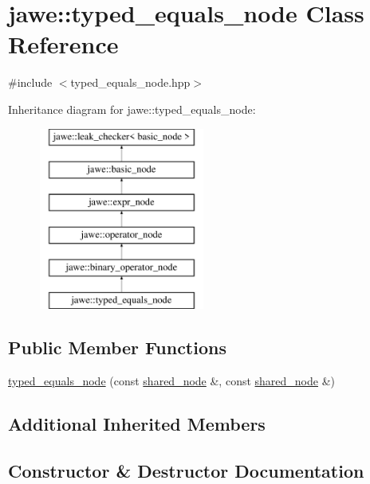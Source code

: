 \hypertarget{classjawe_1_1typed__equals__node}{}\section{jawe\+:\+:typed\+\_\+equals\+\_\+node Class Reference}
\label{classjawe_1_1typed__equals__node}


{\ttfamily \#include $<$typed\+\_\+equals\+\_\+node.\+hpp$>$}

Inheritance diagram for jawe\+:\+:typed\+\_\+equals\+\_\+node\+:\begin{figure}[H]
\begin{center}
\leavevmode
\includegraphics[height=6.000000cm]{classjawe_1_1typed__equals__node}
\end{center}
\end{figure}
\subsection*{Public Member Functions}
\begin{DoxyCompactItemize}
\item 
\hyperlink{classjawe_1_1typed__equals__node_aeac40263be90e2690e356fb5e706f9aa}{typed\+\_\+equals\+\_\+node} (const \hyperlink{namespacejawe_a3f307481d921b6cbb50cc8511fc2b544}{shared\+\_\+node} \&, const \hyperlink{namespacejawe_a3f307481d921b6cbb50cc8511fc2b544}{shared\+\_\+node} \&)
\end{DoxyCompactItemize}
\subsection*{Additional Inherited Members}


\subsection{Constructor \& Destructor Documentation}
\mbox{\label{classjawe_1_1typed__equals__node_aeac40263be90e2690e356fb5e706f9aa}} 
